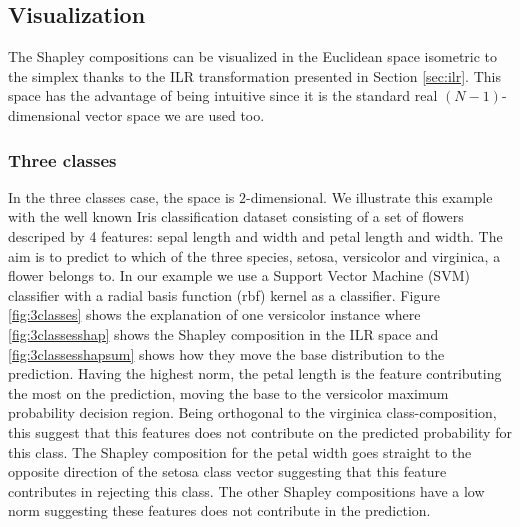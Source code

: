 \documentclass{article}
\theoremstyle{plain}
\theoremstyle{definition}
\theoremstyle{remark}
\begin{document}
\subsection{Visualization}

The Shapley compositions can be visualized in the Euclidean space isometric to the simplex thanks to the ILR transformation presented in Section \ref{sec:ilr}. This space has the advantage of being intuitive since it is the standard real $(N-1)$-dimensional vector space we are used too.

\subsubsection{Three classes}

In the three classes case, the space is $2$-dimensional. We illustrate this example with the well known Iris classification dataset consisting of a set of flowers descriped by 4 features: sepal length and width and petal length and width. The aim is to predict to which of the three species, setosa, versicolor and virginica, a flower belongs to. In our example we use a Support Vector Machine (SVM) classifier with a radial basis function (rbf) kernel as a classifier. Figure \ref{fig:3classes} shows the explanation of one versicolor instance where \ref{fig:3classesshap} shows the Shapley composition in the ILR space and \ref{fig:3classesshapsum} shows how they move the base distribution to the prediction. Having the highest norm, the petal length is the feature contributing the most on the prediction, moving the base to the versicolor maximum probability decision region. Being orthogonal to the virginica class-composition, this suggest that this features does not contribute on the predicted probability for this class. The Shapley composition for the petal width goes straight to the opposite direction of the setosa class vector suggesting that this feature contributes in rejecting this class. The other Shapley compositions have a low norm suggesting these features does not contribute in the prediction.
\end{document}

